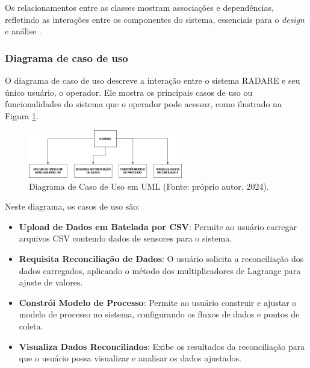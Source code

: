 Os relacionamentos entre as classes mostram associações e dependências, refletindo as interações entre os componentes do sistema, essenciais para o \textit{design} e análise \cite{softwareenguml}.

\subsubsection{Diagrama de caso de uso}

O diagrama de caso de uso descreve a interação entre o sistema RADARE e seu único usuário, o operador. Ele mostra os principais casos de uso ou funcionalidades do sistema que o operador pode acessar, como ilustrado na Figura \ref{fig:UseCaseDiagram}.


\begin{figure}[htbp!]
	\centering
        \includegraphics[width=0.6\textwidth]{figuras/DiagramaCasodeUso.drawio.png}
	\caption{Diagrama de Caso de Uso em UML  (Fonte: próprio autor, 2024).}
	\label{fig:UseCaseDiagram}
\end{figure}

Neste diagrama, os casos de uso são:

\begin{itemize}
    \item \textbf{Upload de Dados em Batelada por CSV}: Permite ao usuário carregar arquivos CSV contendo dados de sensores para o sistema.
    \item \textbf{Requisita Reconciliação de Dados}: O usuário solicita a reconciliação dos dados carregados, aplicando o método dos multiplicadores de Lagrange para ajuste de valores.
    \item \textbf{Constrói Modelo de Processo}: Permite ao usuário construir e ajustar o modelo de processo no sistema, configurando os fluxos de dados e pontos de coleta.
    \item \textbf{Visualiza Dados Reconciliados}: Exibe os resultados da reconciliação para que o usuário possa visualizar e analisar os dados ajustados.
\end{itemize}

